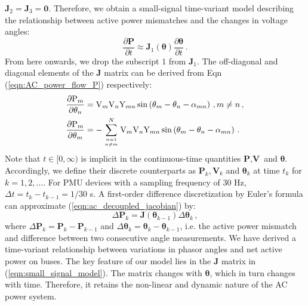$
\mathbf{J}_2 = \mathbf{J}_3 = \mathbf{0}.
$
Therefore, we obtain a small-signal time-variant model describing the relationship between active power mismatches and the changes in voltage angles: 
\begin{equation}
\label{eqn:ac_decoupled_jacobian}
\frac{\partial \textbf{P}}{\partial t} \approx \mathbf{J}_1(\boldsymbol{\theta}) \frac{\partial \boldsymbol{\theta}}{\partial t}\,.
\end{equation}
From here onwards, we drop the subscript $1$ from $\mathbf{J}_1$. The off-diagonal and diagonal elements of the $\mathbf{J}$ matrix can be derived from Eqn (\ref{eqn:AC_power_flow_P}) respectively:
\begin{subequations}
\label{eqn:elements_J}
\begin{align}
    \frac{\partial \text{P}_{m}}{\partial \theta_{n}} 
    & = \text{V}_{m} \text{V}_{n} \text{Y}_{m n} \sin \left( \theta_{m} - \theta_{n} - \alpha_{m n} \right) \,,  m \neq n \,,\label{eqn:elements_J_off}\\ 
    \frac{\partial \text{P}_{m}}{\partial \theta_{m}} 
    & = -\sum_{ n=1 \atop n \neq m}^{N} \text{V}_{m} \text{V}_{n} \text{Y}_{m n} \sin \left( \theta_{m} - \theta_{n} - \alpha_{m n} \right) \,. \label{eqn:elements_J_diag} 
\end{align}
\end{subequations}
Note that $t \in [0, \infty)$ is implicit in the continuous-time quantities $\textbf{P}, \textbf{V}$ and $\boldsymbol{\theta}$. Accordingly, we define their discrete counterparts as $\textbf{P}_k, \textbf{V}_k$ and $\boldsymbol{\theta}_k$ at time $t_k$ for $k = 1, 2, \dots$. For PMU devices with a sampling frequency of 30 Hz, $\Delta t = t_{k} - t_{k-1} = 1/30$ s. A first-order difference discretization by Euler's formula can approximate (\ref{eqn:ac_decoupled_jacobian}) by:
\begin{equation}
\label{eqn:small_signal_model}
    \Delta \textbf{P}_k =  \mathbf{J}(\boldsymbol{\theta}_{k-1}) \Delta \boldsymbol{\theta}_k \,,
\end{equation}
where $\Delta \textbf{P}_k = \textbf{P}_k - \textbf{P}_{k-1}$ and $\Delta \boldsymbol{\theta}_k = \boldsymbol{\theta}_k - \boldsymbol{\theta}_{k-1}$, i.e. the active power mismatch and difference between two consecutive angle measurements. We have derived a time-variant relationship between variations in phasor angles and net active power on buses. 
The key feature of our model lies in the $\mathbf{J}$ matrix in (\ref{eqn:small_signal_model}). The matrix changes with $\boldsymbol{\theta}$, which in turn changes with time. Therefore, it retains the non-linear and dynamic nature of the AC power system.  


